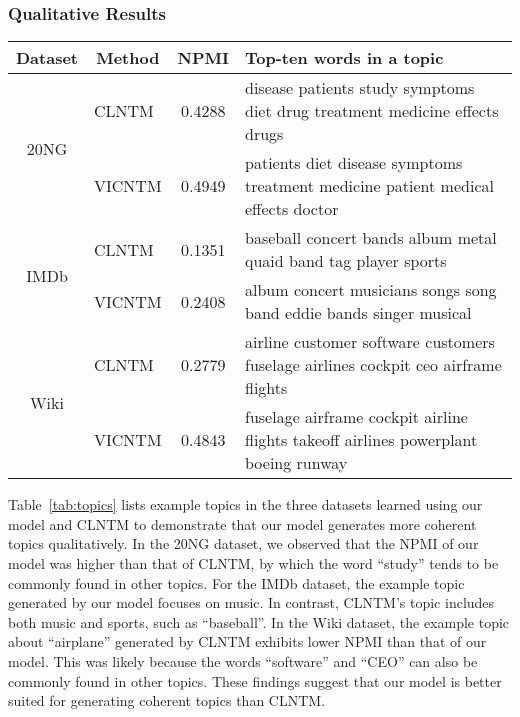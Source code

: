\documentclass{article}
\begin{document}
\subsubsection{Qualitative Results}
\begin{table*}[ht]
\caption{Top-ten words in example topics learned from the datasets}\label{tab:topics}
{\fontsize{7}{6.5}\selectfont
\begin{tabular*}{\textwidth}{c@{}c@{}c@{}c}
    \toprule
    Dataset               & Method & NPMI   & \multicolumn{1}{l}{Top-ten words in a topic}                                                            \\ \midrule
    \multirow{2}{*}{20NG} & \multicolumn{1}{l}{CLNTM}  & 0.4288 & \multicolumn{1}{l}{disease patients study symptoms diet drug treatment medicine effects drugs}          \\
                          & \multicolumn{1}{l}{VICNTM} & 0.4949 & \multicolumn{1}{l}{patients diet disease symptoms treatment medicine patient medical effects doctor}    \\
    \multirow{2}{*}{IMDb} & \multicolumn{1}{l}{CLNTM}  & 0.1351 & \multicolumn{1}{l}{baseball concert bands album metal quaid band tag player sports}                     \\
                          & \multicolumn{1}{l}{VICNTM} & 0.2408 & \multicolumn{1}{l}{album concert musicians songs song band eddie bands singer musical}                  \\
    \multirow{2}{*}{Wiki} & \multicolumn{1}{l}{CLNTM}  & 0.2779 & \multicolumn{1}{l}{airline customer software customers fuselage airlines cockpit ceo airframe flights}  \\
                          & \multicolumn{1}{l}{VICNTM} & 0.4843 & \multicolumn{1}{l}{fuselage airframe cockpit airline flights takeoff airlines powerplant boeing runway} \\ \bottomrule
\end{tabular*}
}
\end{table*}

Table~\ref{tab:topics} lists example topics in the three datasets learned using our model and CLNTM to demonstrate that our model generates more coherent topics qualitatively. 
In the 20NG dataset, we observed that the NPMI of our model was higher than that of CLNTM, by which the word “study” tends to be commonly found in other topics. 
For the IMDb dataset, the example topic generated by our model focuses on music. 
In contrast, CLNTM’s topic includes both music and sports, such as “baseball”.
In the Wiki dataset, the example topic about “airplane” generated by CLNTM exhibits lower NPMI than that of our model. 
This was likely because the words “software” and “CEO” can also be commonly found in other topics. 
These findings suggest that our model is better suited for generating coherent topics than CLNTM.
\end{document}
